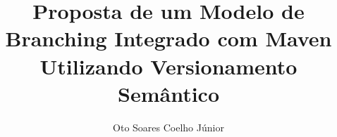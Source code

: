 \documentclass[]{scrartcl}
\title{Proposta de um Modelo de Branching Integrado com Maven Utilizando Versionamento Sem{\^a}ntico}
\author{Oto Soares Coelho J{\'u}nior}
\begin{document}
\maketitle







{}

\end{document}
